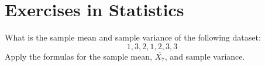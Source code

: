 \section{Exercises in Statistics}\label{S:xsStatistics}
\begin{ExerciseList}
\Exercise What is the sample mean and sample variance of the following dataset:
\[
1, 3, 2, 1, 2, 3, 3
\]
\Answer Apply the formulas for the sample mean, $\overline{X_7}$, and sample variance.
\end{ExerciseList}

